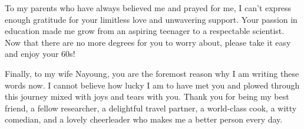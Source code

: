 To my parents who have always believed me and prayed for me, I can't express enough gratitude for your limitless love and unwavering support.
Your passion in education made me grow from an aspiring teenager to a respectable scientist.
Now that there are no more degrees for you to worry about, please take it easy and enjoy your 60s!

Finally, to my wife Nayoung, you are the foremost reason why I am writing these words now.
I cannot believe how lucky I am to have met you and plowed through this journey mixed with joys and tears with you.
Thank you for being my best friend, a fellow researcher, a delightful travel partner, a world-class cook, a witty comedian, and a lovely cheerleader who makes me a better person every day.


